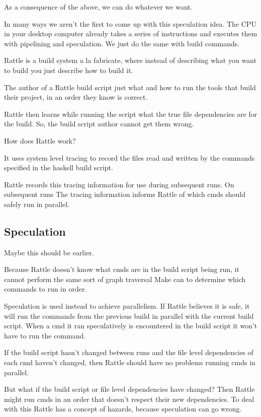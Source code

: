 As a consequence of the above, we can do whatever we want.

In many ways we aren't the first to come up with this speculation idea. The CPU in your desktop computer already takes a series of instructions and executes them with pipelining and speculation. We just do the same with build commands.

Rattle is a build system a la fabricate, where instead of describing what you want to build
you just describe how to build it.

The author of a Rattle build script just what and how to run the tools that build their
project, in an order they know is correct.

Rattle then learns while running the script what the true file dependencies are for the build.
So, the build script author cannot get them wrong.

How does Rattle work?

It uses system level tracing to record the files read and written by the commands specified in
the haskell build script.

Rattle records this tracing information for use during subsequent runs.  On subsequent runs
The tracing information informs Rattle of which cmds should safely run in parallel.

\subsection{Speculation}

Maybe this should be earlier.

Because Rattle doesn't know what cmds are in the build script being run, it cannot perform
the same sort of graph traversal Make can to determine which commands to run in order.

Speculation is used instead to achieve parallelism.  If Rattle believes it is safe, it will run
the commands from the previous build in parallel with the current build script.  When a cmd it
ran speculatively is encountered in the build script it won't have to run the command.

If the build script hasn't changed between runs and the file level dependencies of each cmd
haven't changed, then Rattle should have no problems running cmds in parallel.

But what if the build script or file level dependencies have changed?  Then Rattle might
run cmds in an order that doesn't respect their new dependencies.  To deal with this Rattle
has a concept of hazards, because speculation can go wrong.


